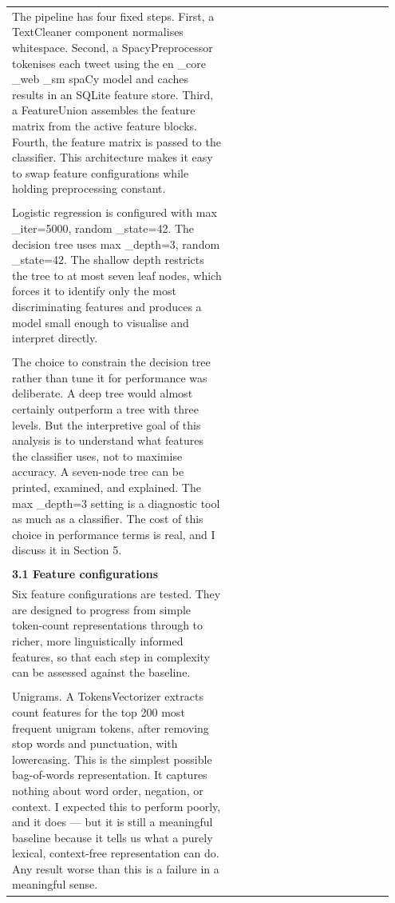 \documentclass[11pt]{article}
\begin{document}
\begin{longtable}{|p{0.55\linewidth}|p{0.40\linewidth}|}
\hline
\rule{0pt}{3.5cm} & \\
\hline
The pipeline has four fixed steps. First, a TextCleaner component normalises whitespace. Second, a SpacyPreprocessor tokenises each tweet using the en \_core \_web \_sm spaCy model and caches results in an SQLite feature store. Third, a FeatureUnion assembles the feature matrix from the active feature blocks. Fourth, the feature matrix is passed to the classifier. This architecture makes it easy to swap feature configurations while holding preprocessing constant. & \\[2pt]
\hline
\rule{0pt}{3.5cm} & \\
\hline
Logistic regression is configured with max \_iter=5000, random \_state=42. The decision tree uses max \_depth=3, random \_state=42. The shallow depth restricts the tree to at most seven leaf nodes, which forces it to identify only the most discriminating features and produces a model small enough to visualise and interpret directly. & \\[2pt]
\hline
\rule{0pt}{3.5cm} & \\
\hline
The choice to constrain the decision tree rather than tune it for performance was deliberate. A deep tree would almost certainly outperform a tree with three levels. But the interpretive goal of this analysis is to understand what features the classifier uses, not to maximise accuracy. A seven-node tree can be printed, examined, and explained. The max \_depth=3 setting is a diagnostic tool as much as a classifier. The cost of this choice in performance terms is real, and I discuss it in Section 5. & \\[2pt]
\hline
\rule{0pt}{3.5cm} & \\
\hline
\multicolumn{2}{|l|}{\textbf{3.1 Feature configurations}} \\[2pt]
\hline
Six feature configurations are tested. They are designed to progress from simple token-count representations through to richer, more linguistically informed features, so that each step in complexity can be assessed against the baseline. & \\[2pt]
\hline
\rule{0pt}{3.5cm} & \\
\hline
Unigrams. A TokensVectorizer extracts count features for the top 200 most frequent unigram tokens, after removing stop words and punctuation, with lowercasing. This is the simplest possible bag-of-words representation. It captures nothing about word order, negation, or context. I expected this to perform poorly, and it does --- but it is still a meaningful baseline because it tells us what a purely lexical, context-free representation can do. Any result worse than this is a failure in a meaningful sense. & \\[2pt]

\end{longtable}
\end{document}
